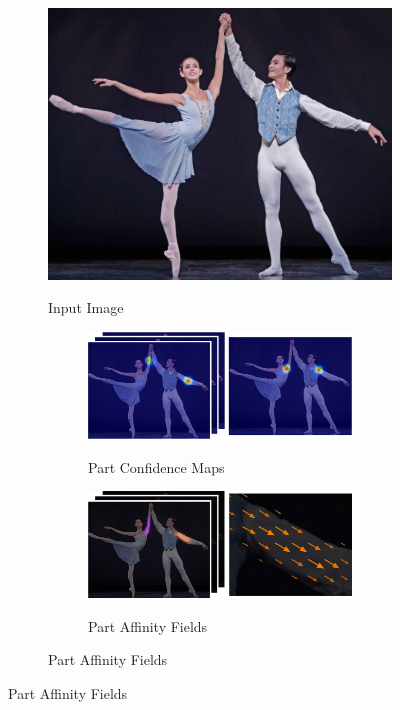 \begin{figure}
  \centering
  \begin{subfigure}[b]{0.25\textwidth}
    \includegraphics[width=0.9\linewidth]{img/openpose_pipeline_a}
    \label{fig:oppA}
    \caption{Input Image}
  \end{subfigure}
  
  \begin{subfigure}[b]{0.25\textwidth}
    \centering
    \begin{subfigure}[b]{1\textwidth}
      \includegraphics[width=0.9\linewidth]{img/openpose_pipeline_b}
      \label{fig:oppB}
      \caption{Part Confidence Maps}
    \end{subfigure}
    
    \begin{subfigure}[b]{1\textwidth}
      \includegraphics[width=0.9\linewidth]{img/openpose_pipeline_c}
      \label{fig:oppC}
      \caption{Part Affinity Fields}
    \end{subfigure}    
  \end{subfigure}
  

\end{figure}
